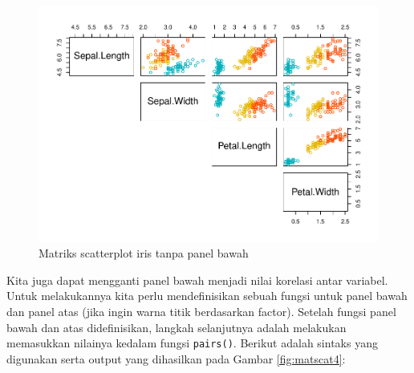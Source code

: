 \documentclass[]{book}
\newenvironment{Shaded}{\begin{snugshade}}{\end{snugshade}}
\newcommand{\KeywordTok}[1]{\textcolor[rgb]{0.13,0.29,0.53}{\textbf{#1}}}
\newcommand{\DataTypeTok}[1]{\textcolor[rgb]{0.13,0.29,0.53}{#1}}
\newcommand{\StringTok}[1]{\textcolor[rgb]{0.31,0.60,0.02}{#1}}
\newcommand{\CommentTok}[1]{\textcolor[rgb]{0.56,0.35,0.01}{\textit{#1}}}
\newcommand{\OtherTok}[1]{\textcolor[rgb]{0.56,0.35,0.01}{#1}}
\newcommand{\OperatorTok}[1]{\textcolor[rgb]{0.81,0.36,0.00}{\textbf{#1}}}
\newcommand{\NormalTok}[1]{#1}
\begin{document}
\begin{Shaded}
\end{Shaded}

\begin{figure}

{\centering \includegraphics[width=0.8\linewidth]{EnvStat_files/figure-latex/matscat3-1} 

}

\caption{Matriks scatterplot iris tanpa panel bawah}\label{fig:matscat3}
\end{figure}

Kita juga dapat mengganti panel bawah menjadi nilai korelasi antar
variabel. Untuk melakukannya kita perlu mendefinisikan sebuah fungsi
untuk panel bawah dan panel atas (jika ingin warna titik berdasarkan
factor). Setelah fungsi panel bawah dan atas didefinisikan, langkah
selanjutnya adalah melakukan memasukkan nilainya kedalam fungsi
\texttt{pairs()}. Berikut adalah sintaks yang digunakan serta output
yang dihasilkan pada Gambar \ref{fig:matscat4}:
\end{document}
